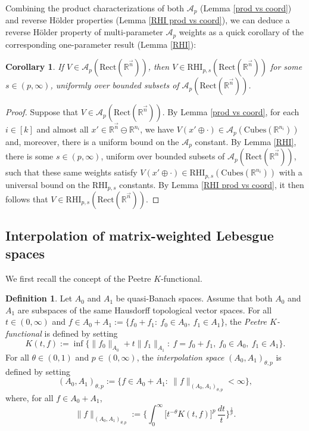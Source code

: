 \documentclass[11pt, reqno]{amsart}
\newtheorem{corollary}[theorem]{Corollary}
\theoremstyle{definition}
\newtheorem{definition}[theorem]{Definition}
\theoremstyle{remark}
\numberwithin{equation}{section}
\newcommand{\A}{\mathscr A}
\newcommand{\R}{\mathbb R}
\newcommand{\vn}{\vec n}
\newcommand{\Cubes}{\mathrm{Cubes}}
\newcommand{\Rect}{\mathrm{Rect}}
\newcommand{\RHI}{\mathrm{RHI}}
\begin{document}
Combining the product characterizations of both $\A_p$ (Lemma \ref{prod vs coord}) and reverse H\"older properties (Lemma \ref{RHI prod vs coord}), we can deduce a reverse H\"older property of multi-parameter $\A_p$ weights as a quick corollary of the corresponding one-parameter result (Lemma \ref{RHI}):

\begin{corollary}\label{Ap to RHI}
If $V\in\A_p(\Rect(\R^{\vn}))$, then $V\in\RHI_{p,s}(\Rect(\R^{\vn}))$ for some $s\in(p,\infty)$, uniformly over bounded subsets of $\A_p(\Rect(\R^{\vn}))$.
\end{corollary}

\begin{proof}
Suppose that $V\in\A_p(\Rect(\R^{\vn}))$. By Lemma \ref{prod vs coord}, for each $i\in[k]$ and almost all $x'\in\R^{\vn}\ominus\R^{n_i}$, we have $V(x'\oplus\cdot)\in\A_p(\Cubes(\R^{n_i}))$ and, moreover, there is a uniform bound on the $\A_p$ constant. By Lemma \ref{RHI}, there is some $s\in(p,\infty)$, uniform over bounded subsets of $\A_p(\Rect(\R^{\vn}))$, such that these same weights satisfy $V(x'\oplus\cdot)\in\RHI_{p,s}(\Cubes(\R^{n_i}))$ with a universal bound on the $\RHI_{p,s}$ constants. By Lemma \ref{RHI prod vs coord}, it then follows that $V\in\RHI_{p,s}(\Rect(\R^{\vn}))$.
\end{proof}

\subsection{Interpolation of matrix-weighted Lebesgue spaces}\label{sec interp}

We first recall the concept of the Peetre $K$-functional.

\begin{definition}
Let $A_0$ and $A_1$ be quasi-Banach spaces.
Assume that both $A_0$ and $A_1$ are subspaces of the same Hausdorff topological vector spaces.
For all $t\in(0,\infty)$ and
$f\in A_0+A_1:=\{f_0+f_1:\ f_0\in A_0,\ f_1\in A_1\}$,
the \emph{Peetre $K$-functional} is defined by setting
$$
K(t,f):=\inf\{\|f_0\|_{A_0}+t\|f_1\|_{A_1}:\
f=f_0+f_1,\ f_0\in A_0,\ f_1\in A_1\}.
$$
For all $\theta\in(0,1)$ and $p\in(0,\infty)$,
the \emph{interpolation space} $(A_0, A_1)_{\theta,p}$ is defined by setting
$$
(A_0, A_1)_{\theta,p}:=\{f\in A_0+A_1:\
\|f\|_{(A_0, A_1)_{\theta,p}}<\infty\},
$$
where, for all $f\in A_0+A_1$,
$$
\|f\|_{(A_0, A_1)_{\theta,p}}:=\bigg\{\int_0^\infty
\Big[t^{-\theta} K(t,f)\Big]^p\,\frac{dt}{t}\bigg\}^{\frac1p}.
$$
\end{definition}
\end{document}

